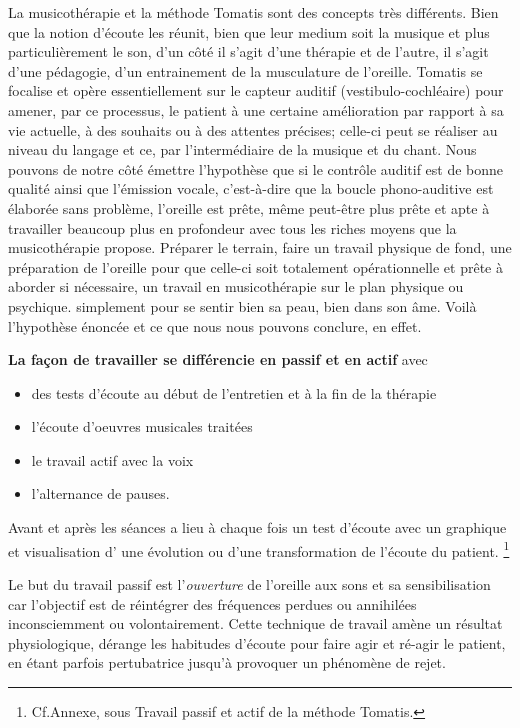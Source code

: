 La musicothérapie et la méthode Tomatis sont des concepts très différents. Bien que la notion d'écoute les réunit, bien que leur medium soit la musique et plus particulièrement le son, d'un côté il s'agit d'une thérapie et de l'autre, il s'agit d'une pédagogie, d'un entrainement de la musculature de l'oreille. 
Tomatis se focalise et opère essentiellement sur le capteur auditif (vestibulo-cochléaire) pour amener, par ce processus, le patient à une certaine  amélioration par rapport à sa vie actuelle, à des souhaits ou à des attentes précises; celle-ci peut se réaliser au niveau du langage et ce, par l'intermédiaire de la musique et du chant. Nous pouvons de notre côté  émettre l'hypothèse que si le contrôle auditif est de bonne qualité ainsi que l'émission vocale, c'est-à-dire que la boucle phono-auditive est élaborée sans problème, l'oreille est prête, même peut-être plus prête et apte à travailler beaucoup plus en profondeur avec tous les riches moyens que la musicothérapie propose.
Préparer le terrain, faire un travail physique de fond, une
préparation de l'oreille pour que celle-ci soit totalement
opérationnelle et prête à aborder si nécessaire, un travail en
musicothérapie sur le plan physique ou psychique. simplement pour se
sentir bien sa peau, bien dans son âme.
Voilà l'hypothèse énoncée et ce que nous nous pouvons conclure, en effet.


\textbf{La façon de travailler se différencie en passif et en actif}
avec 
\begin{itemize}
\item des tests d'écoute au début de l'entretien et à la fin de la thérapie
\item l'écoute d'oeuvres musicales traitées
\item le travail actif avec la voix
\item l'alternance de pauses.
\end{itemize}

Avant et après les séances a lieu à chaque fois un test d'écoute avec un
graphique et visualisation d' une évolution
ou d'une transformation de l'écoute du patient.
 \footnote{Cf.Annexe, sous Travail
   passif et actif de la méthode Tomatis.}



 
Le but du travail passif est l'\emph{ouverture} de l'oreille
aux sons et sa sensibilisation car l'objectif est de réintégrer
des fréquences perdues ou annihilées inconsciemment ou volontairement. 
Cette technique de travail amène un résultat
physiologique, dérange les habitudes d'écoute pour faire agir
et ré-agir le patient, en étant parfois pertubatrice jusqu'à provoquer
un phénomène de rejet.


